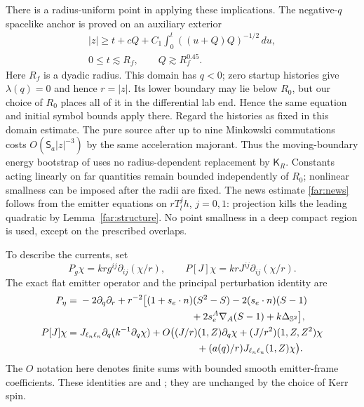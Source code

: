 There is a radius-uniform point in applying these implications.
The negative-$q$ spacelike anchor is proved on an auxiliary exterior
\begin{equation}\label{far:anchor-domain}
 \begin{gathered}
 |z|\ge t+cQ+C_1\int_0^t((u+Q)Q)^{-1/2}\,du,\\
 0\le t\lesssim R_f,\qquad Q\gtrsim R_f^{0.45}.
 \end{gathered}
\end{equation}
Here $R_f$ is a dyadic radius.  This domain has $q<0$; zero startup
histories give $\lambda(q)=0$ and hence $r=|z|$.  Its lower boundary may
lie below $R_0$, but our
choice of $R_0$ places all of it in the differential lab end.  Hence the
same equation and initial symbol bounds apply there.  Regard the
histories as fixed in this domain estimate.  The pure source after up to
nine Minkowski commutations costs
$O(\mathsf S_a|z|^{-3})$ by the same acceleration majorant.
Thus the moving-boundary energy bootstrap of
 uses no radius-dependent replacement by
$\mathsf K_R$.  Constants acting linearly on far quantities remain
bounded independently of $R_0$; nonlinear smallness can be imposed after
the radii are fixed.  The news estimate \eqref{far:news} follows from the
emitter equations on $rT_l^jh$, $j=0,1$: projection kills the leading
quadratic by Lemma~\ref{far:structure}.  No point smallness in a deep
compact region is used, except on the prescribed overlaps.

To describe the currents, set
\[
 P_g\chi=krg^{ij}\partial_{ij}(\chi/r),\qquad
 P[J]\chi=krJ^{ij}\partial_{ij}(\chi/r).
\]
The exact flat emitter operator and the principal perturbation identity are
\begin{align}
 P_\eta={}&-2\partial_q\partial_r+r^{-2}\bigl[
 (1+s_e\cdot n)(S^2-S)-2(s_e\cdot n)(S-1)\notag\\
 &\hspace{40mm}+2s_e^A\nabla_A(S-1)+k\Delta_{\mathbb S^2}\bigr],
                                                        \label{far:flat-operator}\\
 P[J]\chi={}&J_{\ell_n\ell_n}\partial_q(k^{-1}\partial_q\chi)
     +O\bigl((J/r)(1,Z)\partial_q\chi
                       +(J/r^2)(1,Z,Z^2)\chi\notag\\
 &\hspace{42mm}+(a(q)/r)J_{\ell_n\ell_n}(1,Z)\chi\bigr).
                                                        \label{far:perturbation}
\end{align}
The $O$ notation here denotes finite sums with bounded smooth
emitter-frame coefficients.  These identities are  and
; they are unchanged by the choice of Kerr spin.


